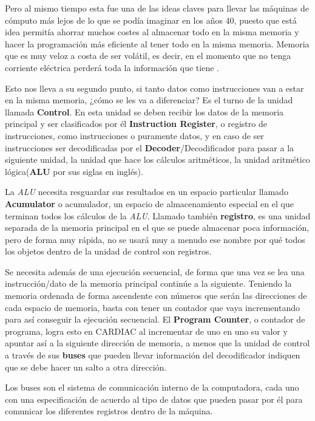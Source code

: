 \documentclass[letterpaper,12pt,oneside]{book}
\begin{document}
        Pero al mismo tiempo esta fue una de las ideas claves para llevar las
		máquinas de cómputo más lejos de lo que se podía imaginar en los años 40, puesto que está idea permitía ahorrar muchos costes al almacenar todo
		en la misma memoria y hacer la programación más eficiente al tener todo en la misma 
		memoria. Memoria que es muy veloz a costa de ser volátil, es decir, en el momento que no tenga corriente eléctrica perderá
		toda la información que tiene \cite{tanenbaum_structured_2013}.
		
		Esto nos lleva a su segundo punto, si tanto datos como instrucciones van a estar en la misma memoria, ¿cómo se les va a diferenciar? Es el turno
		de la unidad llamada \textbf{Control}. En esta unidad se deben recibir los datos de la memoria principal y ser 
		clasificados por él  \textbf{Instruction Register}, o registro de instrucciones,
		como instrucciones o puramente datos, y en caso de ser instrucciones ser decodificadas por el \textbf{Decoder}/Decodificador para pasar a la siguiente  unidad, la 
		unidad
		que hace los cálculos aritméticos, la unidad aritmético lógica(\textbf{ALU} por sus siglas en inglés)\cite{von_neumann_papers_1987}.
  
        La \textit{ALU} necesita resguardar sus 
		resultados en un espacio particular llamado \textbf{Acumulator} o acumulador, un espacio de almacenamiento especial en el que terminan todos los 
		cálculos
		de la \textit{ALU}. Llamado también \textbf{registro},  es una unidad separada de la memoria principal en el que se puede almacenar 
		poca información, pero de forma muy rápida, no se usará muy a menudo ese nombre por qué todos los objetos dentro de la unidad de control son registros\cite{von_neumann_papers_1987}.
 		
        Se necesita además de una ejecución secuencial, de forma que una vez se lea una instrucción/dato de la memoria principal continúe a la 
		siguiente. Teniendo la memoria ordenada de forma ascendente con números que serán las direcciones de cada espacio de memoria, basta con tener un 
		contador
		que vaya incrementando para así conseguir la ejecución secuencial. El \textbf{Program Counter}, o contador de programa, logra esto en CARDIAC al incrementar de uno
		en uno su valor y apuntar así a la siguiente dirección de memoria,
  a menos que la unidad de control a través de sus \textbf{buses} que pueden llevar información del decodificador indiquen que se debe hacer
		un salto a otra dirección\cite{von_neumann_papers_1987}.
  
        Los buses son el sistema de comunicación interno de la computadora, cada uno con una especificación de acuerdo al tipo
		de datos que pueden pasar por él para comunicar los diferentes registros dentro de la máquina\cite{von_neumann_papers_1987}.
		
\end{document}
